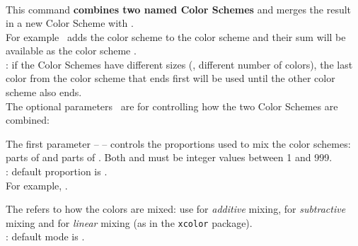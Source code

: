 \subsubsection*{}{\pgfPTMlibsubsubsection{\tmpSection}}%
\label{command:pgfPTCScombine}%
%
\\ [10pt]This command \textbf{combines two named Color Schemes} and merges the result in a new Color Scheme with .
\\ For example \lb{}\rb\ adds the color scheme  to the color scheme  and their sum will be available as the color scheme .
\\ [3pt]: if the Color Schemes have different sizes (\ie, different number of colors), the last color from the color scheme that ends first will be used until the other color scheme also ends.
\\ [3pt]The optional parameters \lp{}\rp\ are for controlling how the two Color Schemes are combined:
\vspace{4pt}%
\begin{itemlist}
\item The first parameter --  -- controls the proportions used to mix the color schemes:  parts of  and  parts of  .  Both  and  must be integer values between 1 and 999.
\\ [3pt]: default proportion is .
\\ For example,  .
\item The  refers to how the colors are mixed: use  for \textit{additive} mixing,  for \textit{subtractive} mixing and  for \textit{linear} mixing (as in the \texttt{\large xcolor} package).
\\ [3pt]: default mode is .
\end{itemlist}
